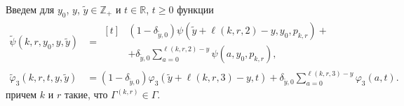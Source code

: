 \documentclass[a4paper,12pt,russian]{extarticle}
\newcommand{\ga}[1]{\Gamma^{\left( #1 \right)} }
\begin{document}
Введем для $y_0$, $y$, $\tilde{y} \in \mathbb{Z}_+$ и $t \in \mathbb{R}$, $t\geqslant 0$ функции
\begin{equation}
\begin{aligned}
\widetilde{\psi}(k,r,y_0,y,\tilde{y}) &= 
\begin{aligned}[t]
&(1 - \delta_{\tilde{y},0}) \psi(\tilde{y}+\ell(k,r,2)-y,y_0, p_{k,r})  +\\
&+ \delta_{\tilde{y},0}\sum_{a=0}^{\ell(k,r,2)-y} \psi(a,y_0, p_{k,r}),
\end{aligned}\\
\widetilde{\varphi}_3(k,r,t,y,\tilde{y}) &= (1-\delta_{\tilde{y},0}) \varphi_3(\tilde{y} + \ell(k,r,3)-y,t)  +\delta_{\tilde{y},0}\sum_{a=0}^{\ell(k,r,3)-y} \varphi_3(a,t).
\end{aligned}
\label{tildephi}
\end{equation}
причем $k$ и $r$ такие, что $\ga{k,r}\in \Gamma$.
	
\end{document}
